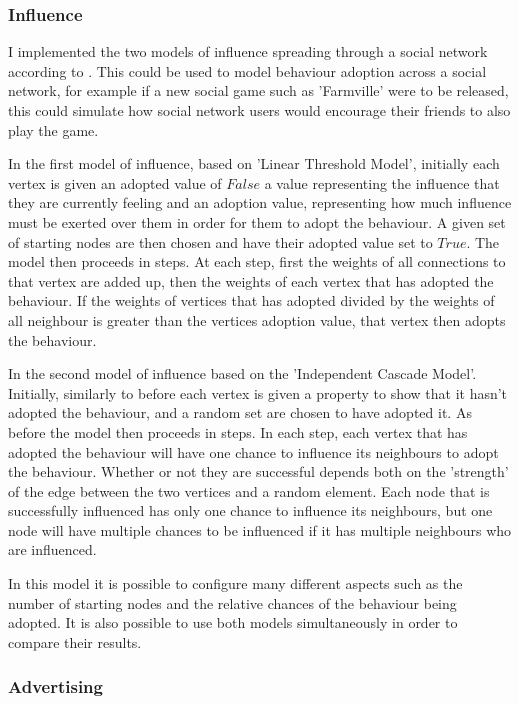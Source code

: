 \documentclass[12pt,a4paper]{article}
\begin{document}
\subsubsection{Influence}

I implemented the two models of influence spreading through a social network according to \cite{kempe2003maximizing}. This could be used to model behaviour adoption across a social network, for example if a new social game such as 'Farmville' were to be released, this could simulate how social network users would encourage their friends to also play the game.

In the first model of influence, based on 'Linear Threshold Model', initially each vertex is given an adopted value of $False$ a value representing the influence that they are currently feeling and an adoption value, representing how much influence must be exerted over them in order for them to adopt the behaviour. A given set of starting nodes are then chosen and have their adopted value set to $True$. The model then proceeds in steps. At each step, first the weights of all connections to that vertex are added up, then the weights of each vertex that has adopted the behaviour. If the weights of vertices that has adopted divided by the weights of all neighbour is greater than the vertices adoption value, that vertex then adopts the behaviour.

In the second model of influence based on the 'Independent Cascade Model'. Initially, similarly to before each vertex is given a property to show that it hasn't adopted the behaviour, and a random set are chosen to have adopted it. As before the model then proceeds in steps. In each step, each vertex that has adopted the behaviour will have one chance to influence its neighbours to adopt the behaviour. Whether or not they are successful depends both on the 'strength' of the edge between the two vertices and a random element. Each node that is successfully influenced has only one chance to influence its neighbours, but one node will have multiple chances to be influenced if it has multiple neighbours who are influenced.

In this model it is possible to configure many different aspects such as the number of starting nodes and the relative chances of the behaviour being adopted. It is also possible to use both models simultaneously in order to compare their results.

\subsubsection{Advertising}
\end{document}
